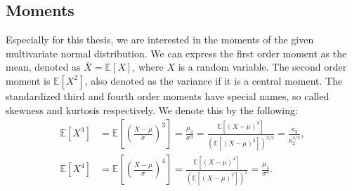 \subsection{Moments}\label{subsec:moments}

Especially for this thesis, we are interested in the moments of the given multivariate normal distribution.
We can express the first order moment as the mean, denoted as $\overline{X} = \mathbb{E}[X]$, where $X$ is a random variable.
The second order moment is $\mathbb{E}[X^2]$, also denoted as the variance if it is a central moment.
The standardized third and fourth order moments have special names, so called skewness and kurtosis respectively.
We denote this by the following:
\begin{align}
    \mathbb{E}[X^3]
    &= \mathbb{E}\left[\left(\frac{X-\mu}{\sigma}\right)^3\right]
    = \frac{\mu_3}{\sigma^3}
    = \frac{\mathbb{E}[(X-\mu)^3]}{(\mathbb{E}[(X-\mu)^2])^{3/2}}
    = \frac{\kappa_3}{\kappa_2^{3/2}}, \\
    \mathbb{E}[X^4]
    &= \mathbb{E}\left[\left(\frac{X-\mu}{\sigma}\right)^4\right]
    = \frac{\mathbb{E}[(X-\mu)^4]}{(\mathbb{E}[(X-\mu)^2])^2}
    = \frac{\mu_4}{\sigma^4}.
\end{align}